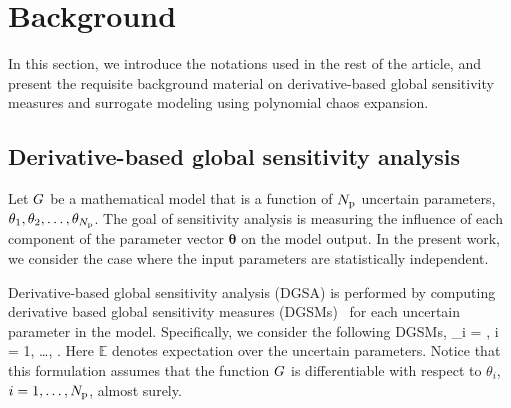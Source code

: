 \section{Background}
\label{sec:bg}

In this section, we introduce the notations used in the rest of
the article, and present the requisite background material on 
derivative-based global sensitivity measures and surrogate modeling 
using polynomial chaos expansion.

\subsection{Derivative-based global sensitivity analysis}  
\label{sub:dgsm}

Let $G$ be a mathematical model that is a function of ${N_\text{p}}$ uncertain 
parameters, $\theta_1, \theta_2, \ldots, \theta_{N_\text{p}}$. The goal of sensitivity analysis
is measuring the influence of each component of the parameter vector 
$\bm{\theta}$ on the model output. 
In the present work, we consider the case where the input parameters are statistically 
independent. 

Derivative-based global sensitivity analysis (DGSA) is performed by 
computing derivative based global sensitivity measures (DGSMs)~\cite{Sobol:2009} 
for each uncertain parameter in the model. 
Specifically, we consider the following DGSMs, 
\be
\mu_i = 
, \quad i = 1, \ldots, \Np.
\label{eq:mu}
\ee
Here $\mathbb{E}$ denotes expectation over the uncertain parameters.
Notice that this formulation assumes that the function $G$ is differentiable
with respect to $\theta_i$, $i = 1, \ldots, {N_\text{p}}$, almost surely.


